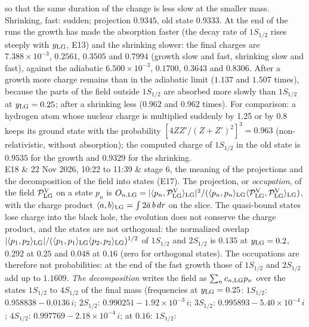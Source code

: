 \documentclass[
  10pt,
]{article}
\begin{document}
\begin{longtable}[]
so that the same duration of the change is less slow at the smaller
mass. Shrinking, fast: sudden; projection \(0.9345\), old state
\(0.9333\). At the end of the runs the growth has made the absorption
faster (the decay rate of \(1S_{1/2}\) rises steeply with
\(y_{\rm LG}\), E13) and the shrinking slower: the final charges are
\(7.388\times10^{-3}\), \(0.2561\), \(0.3505\) and \(0.7994\) (growth
slow and fast, shrinking slow and fast), against the adiabatic
\(6.500\times10^{-3}\), \(0.1700\), \(0.3643\) and \(0.8306\). After a
growth more charge remains than in the adiabatic limit (\(1.137\) and
\(1.507\) times), because the parts of the field outside \(1S_{1/2}\)
are absorbed more slowly than \(1S_{1/2}\) at \(y_{\rm LG}=0.25\); after
a shrinking less (\(0.962\) and \(0.962\) times). For comparison: a
hydrogen atom whose nuclear charge is multiplied suddenly by 1.25 or by
0.8 keeps its ground state with the probability
\([4ZZ'/(Z+Z')^2]^3=0.963\) (non-relativistic, without absorption); the
computed charge of \(1S_{1/2}\) in the old state is \(0.9535\) for the
growth and \(0.9329\) for the shrinking. \\
E18 & 22 Nov 2026, 10:22 to 11:39 & stage 6, the meaning of the
projections and the decomposition of the field into states (E17). The
projection, or \emph{occupation}, of the field
\(\mathcal P^{\rm V}_{\rm LG}\) on a state \(p_n\) is
\(O_{n,{\rm LG}}=\lvert\langle p_n,\mathcal P^{\rm V}_{\rm LG}\rangle_{\rm LG}\rvert^2/(\langle p_n,p_n\rangle_{\rm LG}\langle\mathcal P^{\rm V}_{\rm LG},\mathcal P^{\rm V}_{\rm LG}\rangle_{\rm LG})\),
with the charge product
\(\langle a,b\rangle_{\rm LG}=\int2\bar a\,b\,dr\) on the slice. The
quasi-bound states lose charge into the black hole, the evolution does
not conserve the charge product, and the states are not orthogonal: the
normalized overlap
\(\lvert\langle p_1,p_2\rangle_{\rm LG}\rvert/(\langle p_1,p_1\rangle_{\rm LG}\langle p_2,p_2\rangle_{\rm LG})^{1/2}\)
of \(1S_{1/2}\) and \(2S_{1/2}\) is \(0.135\) at \(y_{\rm LG}=0.2\),
\(0.292\) at \(0.25\) and \(0.048\) at \(0.16\) (zero for orthogonal
states). The occupations are therefore not probabilities: at the end of
the fast growth those of \(1S_{1/2}\) and \(2S_{1/2}\) add up to
\(1.1609\). \emph{The decomposition} writes the field as
\(\sum_nc_{n,{\rm LG}}p_n\) over the states \(1S_{1/2}\) to \(4S_{1/2}\)
of the final mass (frequencies at \(y_{\rm LG}=0.25\): \(1S_{1/2}\):
\(0.958838-0.0136\,i\); \(2S_{1/2}\): \(0.990251-1.92\times10^{-3}\,i\);
\(3S_{1/2}\): \(0.995893-5.40\times10^{-4}\,i\); \(4S_{1/2}\):
\(0.997769-2.18\times10^{-4}\,i\); at \(0.16\): \(1S_{1/2}\):

\end{longtable}
\end{document}
